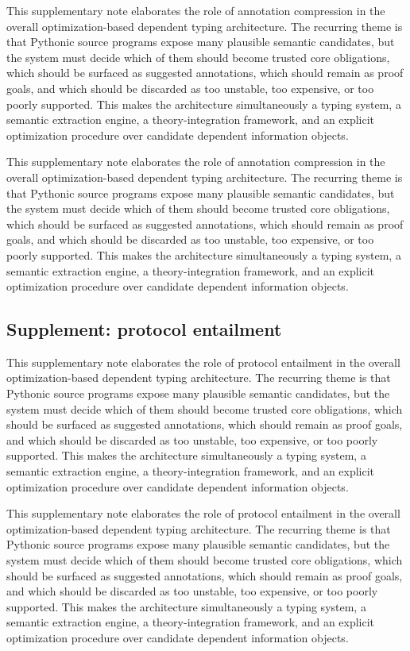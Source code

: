 \documentclass[11pt]{article}
\theoremstyle{definition}
\theoremstyle{plain}
\begin{document}
This supplementary note elaborates the role of annotation compression in the overall
optimization-based dependent typing architecture. The recurring theme is that
Pythonic source programs expose many plausible semantic candidates, but the
system must decide which of them should become trusted core obligations, which
should be surfaced as suggested annotations, which should remain as proof
goals, and which should be discarded as too unstable, too expensive, or too
poorly supported. This makes the architecture simultaneously a typing system,
a semantic extraction engine, a theory-integration framework, and an explicit
optimization procedure over candidate dependent information objects.

This supplementary note elaborates the role of annotation compression in the overall
optimization-based dependent typing architecture. The recurring theme is that
Pythonic source programs expose many plausible semantic candidates, but the
system must decide which of them should become trusted core obligations, which
should be surfaced as suggested annotations, which should remain as proof
goals, and which should be discarded as too unstable, too expensive, or too
poorly supported. This makes the architecture simultaneously a typing system,
a semantic extraction engine, a theory-integration framework, and an explicit
optimization procedure over candidate dependent information objects.

\subsection{Supplement: protocol entailment}
This supplementary note elaborates the role of protocol entailment in the overall
optimization-based dependent typing architecture. The recurring theme is that
Pythonic source programs expose many plausible semantic candidates, but the
system must decide which of them should become trusted core obligations, which
should be surfaced as suggested annotations, which should remain as proof
goals, and which should be discarded as too unstable, too expensive, or too
poorly supported. This makes the architecture simultaneously a typing system,
a semantic extraction engine, a theory-integration framework, and an explicit
optimization procedure over candidate dependent information objects.

This supplementary note elaborates the role of protocol entailment in the overall
optimization-based dependent typing architecture. The recurring theme is that
Pythonic source programs expose many plausible semantic candidates, but the
system must decide which of them should become trusted core obligations, which
should be surfaced as suggested annotations, which should remain as proof
goals, and which should be discarded as too unstable, too expensive, or too
poorly supported. This makes the architecture simultaneously a typing system,
a semantic extraction engine, a theory-integration framework, and an explicit
optimization procedure over candidate dependent information objects.
\end{document}
